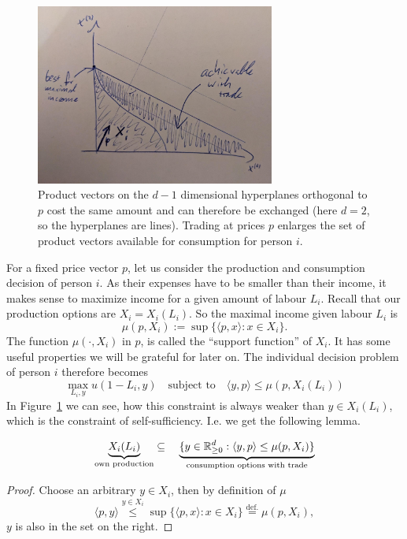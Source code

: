 \begin{figure}
	\centering
	\includegraphics[width=0.7\textwidth]{images/consumption_increase_by_trade.jpeg}
	\caption{
		Product vectors on the \(d-1\) dimensional hyperplanes orthogonal to \(p\)
		cost the same amount and can therefore be exchanged (here \(d=2\), so the
		hyperplanes are lines). Trading at prices \(p\) enlarges the set of
		product vectors available for consumption for person \(i\).
	}
	\label{fig: consumption increase by trade}
\end{figure}
For a fixed price vector \(p\), let us consider the production and consumption
decision of person \(i\). As their expenses have to be smaller than their
income, it makes sense to maximize income for a given amount of labour \(L_i\).
Recall that our production options are \(X_i=X_i(L_i)\). So the maximal income
given labour \(L_i\) is
\[
	\tag{income}\label{eq: income}
	\mu(p, X_i) := \sup\{\langle p, x\rangle : x\in X_i\}.
\]
The function \(\mu(\cdot, X_i)\) in \(p\), is called the ``support function'' of
\(X_i\). It has some useful properties we will be grateful for later on. The
individual decision problem of person \(i\) therefore becomes
\begin{equation}
	\tag{IDP}
	\label{eq: individual decision problem}
	\max_{L_i, y} u(1-L_i, y) \quad\text{subject to}\quad \langle y, p\rangle \le \mu(p, X_i(L_i))
\end{equation}
In Figure~\ref{fig: consumption increase by trade} we can see, how this
constraint is always weaker than \(y\in X_i(L_i)\), which is the constraint of
self-sufficiency. I.e. we get the following lemma.

\begin{lemma}
\[
	\underbrace{X_i(L_i)}_{\text{own production}}
	\subseteq \quad
	\underbrace{
		\{y\in\mathbb{R}_{\ge 0}^d: \langle y, p\rangle \le \mu(p, X_i)\}
	}_{\text{consumption options with trade}}
\]
\end{lemma}
\begin{proof}
	Choose an arbitrary \(y\in X_i\), then by definition of \(\mu\)
	\[
		\langle p, y\rangle \overset{y\in X_i}\le \sup\{\langle p, x\rangle : x\in
		X_i\} \overset{\text{def.}}= \mu(p, X_i),
	\]
	\(y\) is also in the set on the right.
\end{proof}


